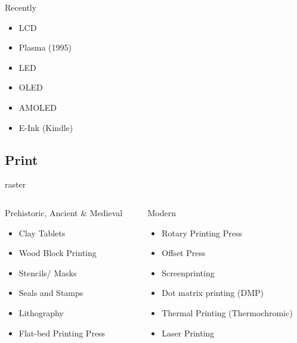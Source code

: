 \documentclass[aspectratio=169,xcolor={dvipsnames,svgnames}]{beamer}
\begin{document}
\begin{frame}[label={sec:orgc05f6cb}]{Recently}
\begin{itemize}
\item LCD
\item Plasma (1995)
\item LED
\item OLED
\item AMOLED
\item E-Ink (Kindle)
\end{itemize}
\end{frame}

\subsection{Print}
\label{sec:org30b80ea}

\begin{frame}[label={sec:org73c29c6}]{raster}
\begin{columns}
\begin{column}{0.5\columnwidth}
Prehistoric, Ancient \& Medieval
\begin{itemize}
\item Clay Tablets
\item Wood Block Printing
\item Stencils/ Masks
\item Seals and Stamps
\item Lithography
\item Flat-bed Printing Press
\end{itemize}
\end{column}
\begin{column}{.5\columnwidth}
Modern
\begin{itemize}
\item Rotary Printing Press
\item Offset Press
\item Screenprinting
\item Dot matrix printing (DMP)
\item Thermal Printing (Thermochromic)
\item Laser Printing
\end{itemize}
\end{column}
\end{columns}
\end{frame}
\end{document}
